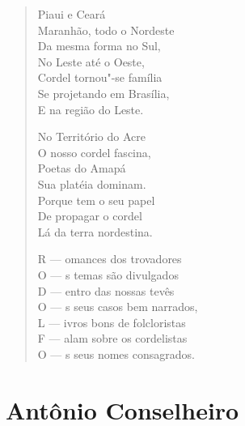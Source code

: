 \begin{verse}
Piaui e Ceará \\
Maranhão, todo o Nordeste \\
Da mesma forma no Sul, \\
No Leste até o Oeste, \\
Cordel tornou"-se família \\
Se projetando em Brasília, \\
E na região do Leste. 
\pagebreak

No Território do Acre \\
O nosso cordel fascina, \\
Poetas do Amapá \\
Sua platéia dominam. \\
Porque tem o seu papel \\
De propagar o cordel \\
Lá da terra nordestina. 

R --- omances dos trovadores \\
O --- s temas são divulgados \\
D --- entro das nossas tevês \\
O --- s seus casos bem narrados, \\
L --- ivros bons de folcloristas \\
F --- alam sobre os cordelistas \\
O --- s seus nomes consagrados. 
\end{verse}

\chapter{Antônio Conselheiro}

